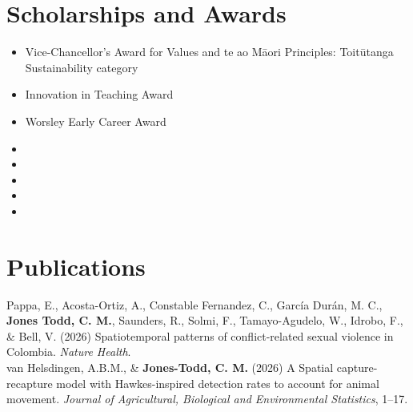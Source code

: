 \documentclass[10pt,a4paper]{moderncv}
\begin{document}
\section{Scholarships and Awards}
\vspace{2pt}
\begin{itemize}
  \item { {Vice‑Chancellor’s Award for Values and te ao Māori Principles: Toitūtanga Sustainability category}{}{}{}}
  \item { {Innovation in Teaching Award}{}{}{}}
\item { {Worsley Early Career Award}{}{}{}}
  \item {}
  \item {}
 \item {}
 \item{}
   \item{}
  \vspace{2pt}

\end{itemize}
\newpage
  \section{Publications}


  Pappa, E., Acosta-Ortiz, A., Constable Fernandez, C., García Durán, M. C., \textbf{Jones Todd, C. M.}, Saunders, R., Solmi, F., Tamayo-Agudelo, W., Idrobo, F., \& Bell, V. (2026) Spatiotemporal patterns of conflict-related sexual violence in Colombia. \textit{Nature Health}.\\

  van Helsdingen, A.B.M., \& \textbf{Jones-Todd, C. M.} (2026) A Spatial capture-recapture model with Hawkes-inspired detection rates to account for animal movement. \textit{Journal of Agricultural, Biological and Environmental Statistics}, 1--17.\\
\end{document}
